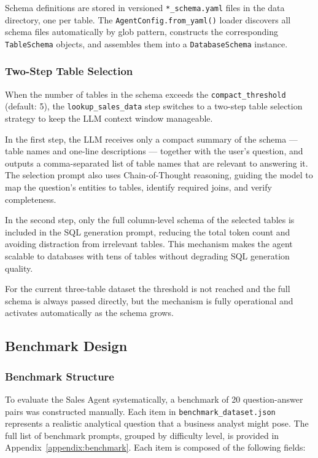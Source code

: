 Schema definitions are stored in versioned \texttt{*\_schema.yaml} files in the
data directory, one per table. The \texttt{AgentConfig.from\_yaml()} loader
discovers all schema files automatically by glob pattern, constructs the
corresponding \texttt{TableSchema} objects, and assembles them into a
\texttt{DatabaseSchema} instance.

\subsubsection{Two-Step Table Selection}

When the number of tables in the schema exceeds the \texttt{compact\_threshold}
(default: 5), the \texttt{lookup\_sales\_data} step switches to a two-step table
selection strategy to keep the LLM context window manageable.

In the first step, the LLM receives only a compact summary of the schema — table
names and one-line descriptions — together with the user's question, and outputs a
comma-separated list of table names that are relevant to answering it. The selection
prompt also uses Chain-of-Thought reasoning, guiding the model to map the
question's entities to tables, identify required joins, and verify completeness.

In the second step, only the full column-level schema of the selected tables is
included in the SQL generation prompt, reducing the total token count and avoiding
distraction from irrelevant tables. This mechanism makes the agent scalable to
databases with tens of tables without degrading SQL generation quality.

For the current three-table dataset the threshold is not reached and the full
schema is always passed directly, but the mechanism is fully operational and
activates automatically as the schema grows.

\subsection{Benchmark Design}
\label{subsec:benchmark}

\subsubsection{Benchmark Structure}

To evaluate the Sales Agent systematically, a benchmark of 20 question-answer pairs
was constructed manually. Each item in \texttt{benchmark\_dataset.json} represents
a realistic analytical question that a business analyst might pose. The full list of
benchmark prompts, grouped by difficulty level, is provided in
Appendix~\ref{appendix:benchmark}. Each item is composed of the following fields:

